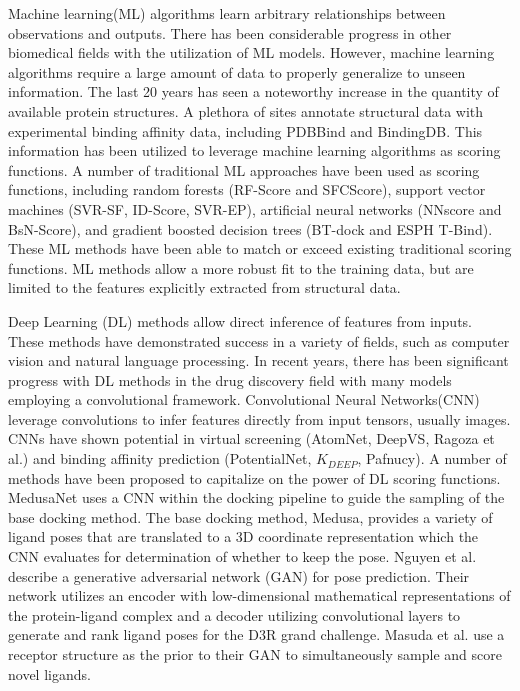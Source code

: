 \documentclass[journal=jcisd8,manuscript=article]{achemso}
\begin{document}
Machine learning(ML) algorithms learn arbitrary relationships between observations and outputs. There has been considerable progress in other biomedical fields with the utilization of ML models\cite{zitnik2019machine}. However, machine learning algorithms require a large amount of data to properly generalize to unseen information. The last 20 years has seen a noteworthy increase in the quantity of available protein structures\cite{berman2000protein}. A plethora of sites annotate structural data with experimental binding affinity data, including PDBBind and BindingDB\cite{wang2004pdbbind,liu2017forging,gilson2016bindingdb}. This information has been utilized to leverage machine learning algorithms as scoring functions. A number of traditional ML approaches have been used as scoring functions, including random forests (RF-Score\cite{ballester2010machine} and SFCScore\cite{zilian2013sfcscore}), support vector machines (SVR-SF\cite{li2011svr}, ID-Score\cite{li2013idscore}, SVR-EP), artificial neural networks (NNscore\cite{durrant2010nnscore} and BsN-Score\cite{ashtawy2015bsn}), and gradient boosted decision trees (BT-dock\cite{btdock} and ESPH T-Bind\cite{cang2018integration}). These ML methods have been able to match or exceed existing traditional scoring functions. ML methods allow a more robust fit to the training data, but are limited to the features explicitly extracted from structural data.

Deep Learning (DL) methods allow direct inference of features from inputs. These methods have demonstrated success in a variety of fields, such as computer vision and natural language processing\cite{krizhevsky2017imagenet,brown2020language}. In recent years, there has been significant progress with DL methods in the drug discovery field with many models employing a convolutional framework. Convolutional Neural Networks(CNN) leverage convolutions to infer features directly from input tensors, usually images. CNNs have shown potential in virtual screening (AtomNet\cite{wallach2015atomnet}, DeepVS\cite{pereira2016boosting}, Ragoza et al.\cite{Ragoza2017}) and binding affinity prediction (PotentialNet\cite{feinberg2018potentialnet}, $K_{DEEP}$\cite{jimenez2018k}, Pafnucy\cite{stepniewska2018development}). A number of methods have been proposed to capitalize on the power of DL scoring functions. MedusaNet uses a CNN within the docking pipeline to guide the sampling of the base docking method\cite{jiang2020guiding}. The base docking method, Medusa, provides a variety of ligand poses that are translated to a 3D coordinate representation which the CNN evaluates for determination of whether to keep the pose. Nguyen et al. \cite{nguyen2020mathdl} describe a generative adversarial network (GAN) for pose prediction. Their network utilizes an encoder with low-dimensional mathematical representations of the protein-ligand complex and a decoder utilizing convolutional layers to generate and rank ligand poses for the D3R grand challenge. Masuda et al. \cite{masuda2020generating} use a receptor structure as the prior to their GAN to simultaneously sample and score novel ligands.
\end{document}
